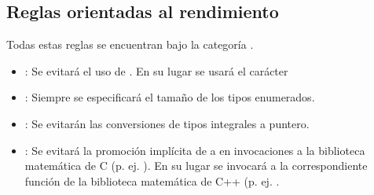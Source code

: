 \subsection{Reglas orientadas al rendimiento}

Todas estas reglas se encuentran bajo la categoría .

\begin{itemize}

\item {}:
Se evitará el uso de . 
En su lugar se usará el carácter 

\item {}:
Siempre se especificará el tamaño de los tipos enumerados.

\item {}:
Se evitarán las conversiones de tipos integrales a puntero.

\item {}:
Se evitará la promoción implícita de  a  en 
invocaciones a la biblioteca matemática de C (p. ej. ).
En su lugar se invocará a la correspondiente función de la biblioteca
matemática de C++ (p. ej. .

\end{itemize}
